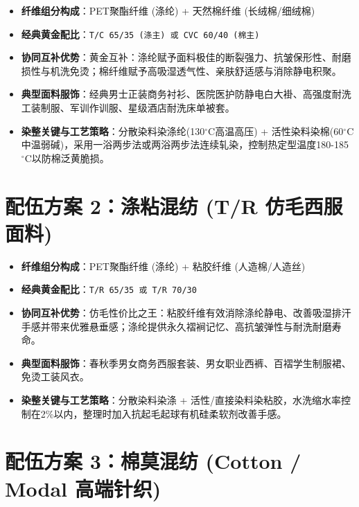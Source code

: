 \documentclass[11pt,openright,twoside,UTF8]{ctexbook}
\begin{document}
\begin{itemize} \setlength{\itemsep}{2.5pt}
    \item \textbf{纤维组分构成}：PET聚酯纤维 (涤纶) + 天然棉纤维 (长绒棉/细绒棉)
    \item \textbf{经典黄金配比}：\texttt{T/C 65/35 (涤主) 或 CVC 60/40 (棉主)}
    \item \textbf{协同互补优势}：黄金互补：涤纶赋予面料极佳的断裂强力、抗皱保形性、耐磨损性与机洗免烫；棉纤维赋予高吸湿透气性、亲肤舒适感与消除静电积聚。
    \item \textbf{典型面料服饰}：经典男士正装商务衬衫、医院医护防静电白大褂、高强度耐洗工装制服、军训作训服、星级酒店耐洗床单被套。
    \item \textbf{染整关键与工艺策略}：分散染料染涤纶(130$^\circ\mathrm{C}$高温高压) + 活性染料染棉(60$^\circ\mathrm{C}$中温弱碱)，采用一浴两步法或两浴两步法连续轧染，控制热定型温度180-185$^\circ\mathrm{C}$以防棉泛黄脆损。
\end{itemize}
\vspace{0.3cm}

\section{配伍方案 2：涤粘混纺 (T/R 仿毛西服面料)}

\begin{itemize} \setlength{\itemsep}{2.5pt}
    \item \textbf{纤维组分构成}：PET聚酯纤维 (涤纶) + 粘胶纤维 (人造棉/人造丝)
    \item \textbf{经典黄金配比}：\texttt{T/R 65/35 或 T/R 70/30}
    \item \textbf{协同互补优势}：仿毛性价比之王：粘胶纤维有效消除涤纶静电、改善吸湿排汗手感并带来优雅悬垂感；涤纶提供永久褶裥记忆、高抗皱弹性与耐洗耐磨寿命。
    \item \textbf{典型面料服饰}：春秋季男女商务西服套装、男女职业西裤、百褶学生制服裙、免烫工装风衣。
    \item \textbf{染整关键与工艺策略}：分散染料染涤 + 活性/直接染料染粘胶，水洗缩水率控制在2\%以内，整理时加入抗起毛起球有机硅柔软剂改善手感。
\end{itemize}
\vspace{0.3cm}

\section{配伍方案 3：棉莫混纺 (Cotton / Modal 高端针织)}
\end{document}
